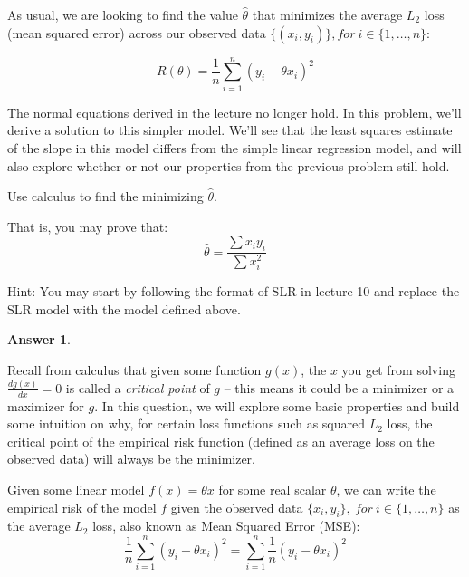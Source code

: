 \documentclass[addpoints, 12pt]{exam}
\theoremstyle{definition}
\newtheorem*{answer}{Answer}
\begin{document}
\begin{questions}
\noindent As usual, we are looking to find the value $\hat{\theta}$ that minimizes the average $L_2$ loss (mean squared error) across our observed data $\{(x_i, y_i)\}, for\ i\in \{1, \ldots, n\}$:

$$R(\theta) = \frac{1}{n}\sum_{i=1}^n (y_i - \theta x_i)^2$$

\noindent The normal equations derived in the lecture no longer hold. In this problem, we'll derive a solution to this simpler model. We'll see that the least squares estimate of the slope in this model differs from the simple linear regression model, and will also explore whether or not our properties from the previous problem still hold.


Use calculus to find the minimizing $\hat{\theta}$. 

That is, you may prove that: 
$$ \hat{\theta} = \frac{\sum x_iy_i}{\sum x_i^2}$$

Hint: You may start by following the format of SLR in lecture 10 and replace the SLR model with the model defined above. 

   \begin{shaded}
    \begin{answer}


    \end{answer}
    \end{shaded}



\newpage

\question[10]Recall from calculus that given some function $g(x)$, the $x$ you get from solving $\frac{d g(x)}{dx} = 0$ is called a \textit{critical point}
of $g$ -- this means it could be a minimizer or a maximizer for $g$. In this question, we will explore some basic properties and 
build some intuition on why, for certain loss functions such as squared $L_2$ loss, the critical point of the empirical risk function (defined as an average loss on the observed data) will always be the minimizer.

Given some linear model $f(x) = \theta x$ for some real scalar $\theta$, we can write the empirical risk of the model $f$ given the observed data $\{x_i, y_i\}, \ for \ i\in \{ 1, \dots, n\}$ as the average $L_2$ loss, also known as Mean Squared Error (MSE):
\begin{equation*}
    \frac{1}{n}\sum_{i=1}^n (y_i - \theta x_i)^2 = \sum_{i=1}^n \frac{1}{n}(y_i - \theta x_i)^2
\end{equation*}


\end{questions}
\end{document}
